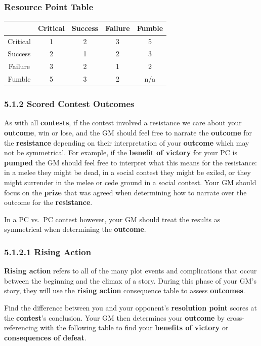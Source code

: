 \documentclass[
]{article}
\begin{document}
\hypertarget{resource-point-table}{%
\subsubsection{Resource Point Table}\label{resource-point-table}}

\begin{longtable}[]{@{}ccccc@{}}
\toprule
& Critical & Success & Failure & Fumble\tabularnewline
\midrule
\endhead
Critical & 1 & 2 & 3 & 5\tabularnewline
Success & 2 & 1 & 2 & 3\tabularnewline
Failure & 3 & 2 & 1 & 2\tabularnewline
Fumble & 5 & 3 & 2 & n/a\tabularnewline
\bottomrule
\end{longtable}

\hypertarget{scored-contest-outcomes}{%
\subsubsection{5.1.2 Scored Contest
Outcomes}\label{scored-contest-outcomes}}

As with all \textbf{contests}, if the contest involved a resistance we
care about your \textbf{outcome}, win or lose, and the GM should feel
free to narrate the \textbf{outcome} for the \textbf{resistance}
depending on their interpretation of your \textbf{outcome} which may not
be symmetrical. For example, if the \textbf{benefit of victory} for your
PC is \textbf{pumped} the GM should feel free to interpret what this
means for the resistance: in a melee they might be dead, in a social
contest they might be exiled, or they might surrender in the melee or
cede ground in a social contest. Your GM should focus on the
\textbf{prize} that was agreed when determining how to narrate over the
outcome for the \textbf{resistance}.

In a PC vs.~PC contest however, your GM should treat the results as
symmetrical when determining the \textbf{outcome}.

\hypertarget{rising-action}{%
\subsubsection{5.1.2.1 Rising Action}\label{rising-action}}

\textbf{Rising action} refers to all of the many plot events and
complications that occur between the beginning and the climax of a
story. During this phase of your GM's story, they will use the
\textbf{rising action} consequence table to assess \textbf{outcomes}.

Find the difference between you and your opponent's \textbf{resolution
point} scores at the \textbf{contest}'s conclusion. Your GM then
determines your \textbf{outcome} by cross-referencing with the following
table to find your \textbf{benefits of victory} or \textbf{consequences
of defeat}.
\end{document}

